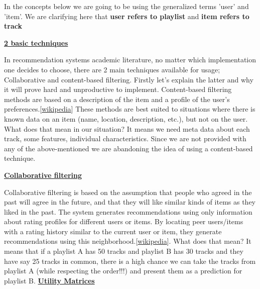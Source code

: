 \documentclass[]{article}
\begin{document}
In the concepts below we are going to be using the generalized terms 'user' and 'item'. We are clarifying here that \textbf{user refers to playlist} and \textbf{item refers to track}
\begin{center}
	\Large\textbf{\underline{2 basic techniques}}
	
	In recommendation systems academic literature, no matter which implementation one decides to choose, there are 2 main techniques available for usage; Collaborative and content-based filtering. Firstly let's explain the latter and why it will prove hard and unproductive to implement. Content-based filtering methods are based on a description of the item and a profile of the user's preferences.[\href{https://en.wikipedia.org/wiki/Recommender_system#:~:text=of%20hybrid%20systems.-,Content%2Dbased%20filtering,-%5Bedit%5D}{wikipedia}] These methods are best suited to situations where there is known data on an item (name, location, description, etc.), but not on the user. What does that mean in our situation? It means we need meta data about each track, some features, individual characteristics. Since we are not provided with any of the above-mentioned we are abandoning the idea of using a content-based technique.
	
	\textbf{\underline{Collaborative filtering}}
	
	Collaborative filtering is based on the assumption that people who agreed in the past will agree in the future, and that they will like similar kinds of items as they liked in the past. The system generates recommendations using only information about rating profiles for different users or items. By locating peer users/items with a rating history similar to the current user or item, they generate recommendations using this neighborhood.[\href{https://en.wikipedia.org/wiki/Recommender_system#:~:text=Approaches%5Bedit%5D-,Collaborative%20filtering,-%5Bedit%5D}{wikipedia}]. What does that mean? It means that if a playlist A has 50 tracks and playlist B has 30 tracks and they have say 25 tracks in common, there is a high chance we can take the tracks from playlist A (while respecting the order!!!) and present them as a prediction for playlist B. 
	\textbf{\underline{Utility Matrices}}
	

\end{center}
\end{document}
